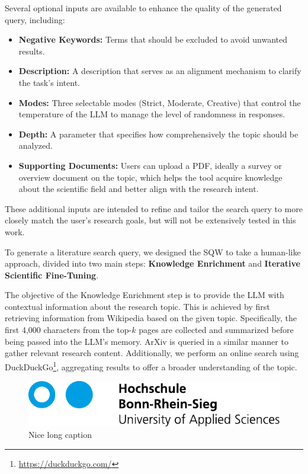 Several optional inputs are available to enhance the quality of the generated query, including:
\begin{itemize}
	
\item \textbf{Negative Keywords:} Terms that should be excluded to avoid unwanted results.
\item \textbf{Description:} A description that serves as an alignment mechanism to clarify the task’s intent.
\item \textbf{Modes:} Three selectable modes (Strict, Moderate, Creative) that control the temperature of the LLM to manage the level of randomness in responses.
\item \textbf{Depth:} A parameter that specifies how comprehensively the topic should be analyzed.
\item \textbf{Supporting Documents:} Users can upload a PDF, ideally a survey or overview document on the topic, which helps the tool acquire knowledge about the scientific field and better align with the research intent.

\end{itemize}
These additional inputs are intended to refine and tailor the search query to more closely match the user's research goals, but will not be extensively tested in this work.

To generate a literature search query, we designed the SQW to take a human-like approach, divided into two main steps: \textbf{Knowledge Enrichment} and \textbf{Iterative Scientific Fine-Tuning}.

The objective of the Knowledge Enrichment step is to provide the LLM with contextual information about the research topic. This is achieved by first retrieving information from Wikipedia based on the given topic. Specifically, the first 4,000 characters from the top-\( k \) pages are collected and summarized before being passed into the LLM's memory. ArXiv is queried in a similar manner to gather relevant research content. Additionally, we perform an online search using DuckDuckGo\footnote{\url{https://duckduckgo.com/}}, aggregating results to offer a broader understanding of the topic.

\begin{figure}
	\centering
	\includegraphics{FrontBackmatter/H-BRS_Logo_A4}
	\caption[Nice short caption]{Nice long caption}
	\label{fig:sqw-overview}
\end{figure}

